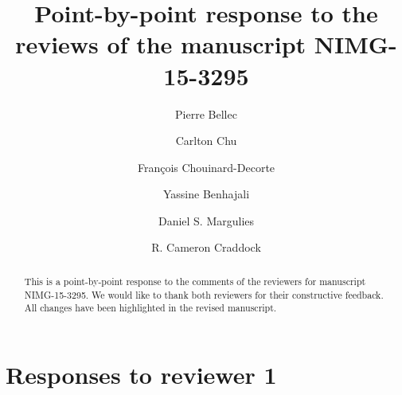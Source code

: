 \documentclass[authoryear,3p]{elsarticle}
\begin{document}
\begin{frontmatter}
\title{Point-by-point response to the reviews of the manuscript NIMG-15-3295}


\author[label0,label1,label2]{Pierre Bellec}
\address[label0]{The Neuro Bureau}
\address[label1]{Centre de Recherche de l'Institut Universitaire de G\'eriatrie de Montr\'eal, Montr\'eal, CA}
\address[label2]{D\'epartement d'Informatique et de Recherche Op\'erationnelle, Universit\'e de Montr\'eal, Montr\'eal, CA}



\author[label0,label3]{Carlton Chu}
\address[label3]{Google DeepMind, London, UK}

\author[label0,label1,label4]{Fran\c{c}ois Chouinard-Decorte}
\address[label4]{Integrated Program in Neuroscience, McGill University, Montreal, CA}

\author[label0,label1,label5]{Yassine Benhajali}
\address[label5]{D\'epartement d'Anthropologie, Universit\'e de Montr\'eal, Montr\'eal, CA}

\author[label0,label6]{Daniel S. Margulies}
\address[label6]{Max Planck Research Group for Neuroanatomy \& Connectivity, Max Planck Institute for Human Cognitive and Brain Sciences, Leipzig, Germany}

\author[label0,lab7,lab8]{R. Cameron Craddock}
\address[lab7]{Computational Neuroimaging Laboratory, Center for Biomedical Imaging and Neuromodulation, Nathan S. Kline Institute for Psychiatric Research, Orangeburg, NY, USA}
\address[lab8]{Center for the Developing Brain, Child Mind Institute, New York, NY, USA}

\begin{abstract} This is a point-by-point response to the comments of the reviewers for manuscript NIMG-15-3295. We would like to thank both reviewers for their constructive feedback. All changes have been highlighted in the revised manuscript. 
\end{abstract}

\end{frontmatter}


\section{Responses to reviewer 1}
\end{document}
